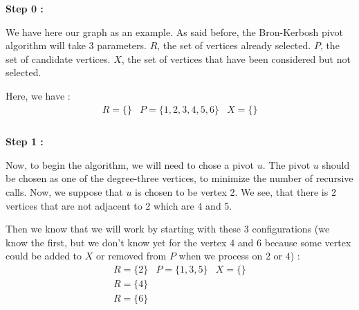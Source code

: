 \hspace*{1cm} \textbf{Step 0 :}
\\
\begin{minipage}{0.4\textwidth}
\end{minipage}
\begin{minipage}{0.6\textwidth}
    We have here our graph as an example. As said before, the Bron-Kerbosh pivot algorithm will take 3 parameters. $R$, the set of vertices already selected. $P$, the set of candidate vertices. $X$, the set of vertices that have been considered but not selected.
\end{minipage}
Here, we have :
$$ \boxed{
        \begin{array}{lll}
            R = \{\} & P = \{1,2,3,4,5,6\} & X = \{\} \\
        \end{array}
    }$$
\\
\hspace*{1cm}  \textbf{Step 1 :}
\\
\begin{minipage}{0.4\textwidth}
\end{minipage}
\begin{minipage}{0.6\textwidth}
    Now, to begin the algorithm, we will need to chose a pivot $u$. The pivot $u$ should be chosen as one of the degree-three vertices, to minimize the number of recursive calls. Now, we suppose that $u$ is chosen to be vertex 2. We see, that there is 2 vertices that are not adjacent to 2 which are 4 and 5.
\end{minipage}
Then we know that we will work by starting with these 3 configurations (we know the first, but we don't know yet for the vertex $4$ and $6$ because some vertex could be added to $X$ or removed from $P$ when we process on $2$ or $4$) :
$$ \boxed{
        \begin{array}{lll}
            R = \{2\} & P = \{1,3,5\} & X =\{\} \\
            R = \{4\}                           \\
            R = \{6\}                           \\
        \end{array}
    }$$
